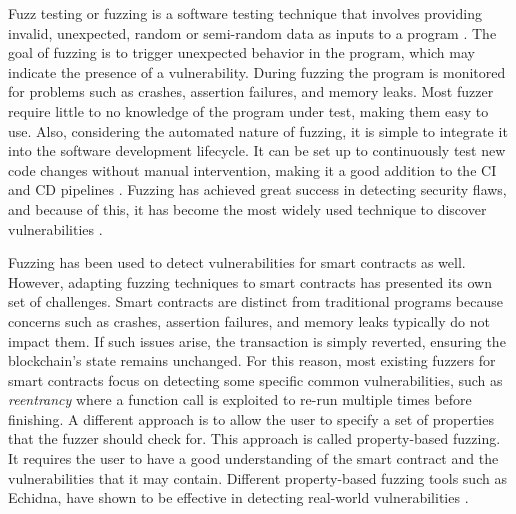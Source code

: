 Fuzz testing or fuzzing is a software testing technique that involves providing invalid, unexpected, random or semi-random data as inputs to a program \cite{manes_art_2019}.
The goal of fuzzing is to trigger unexpected behavior in the program, which may indicate the presence of a vulnerability.
During fuzzing the program is monitored for problems such as crashes, assertion failures, and memory leaks.
Most fuzzer require little to no knowledge of the program under test, making them easy to use.
Also, considering the automated nature of fuzzing, it is simple to integrate it into the software development lifecycle.
It can be set up to continuously test new code changes without manual intervention, making it a good addition to the \ac{CI} and \ac{CD} pipelines \cite{klooster_effectiveness_2022}.
Fuzzing has achieved great success in detecting security flaws, and because of this, it has become the most widely used technique to discover vulnerabilities \cite{li_fuzzing_2018, zhu_fuzzing_2022}.

Fuzzing has been used to detect vulnerabilities for smart contracts as well.
However, adapting fuzzing techniques to smart contracts has presented its own set of challenges.
Smart contracts are distinct from traditional programs because concerns such as crashes, assertion failures, and memory leaks typically do not impact them.
If such issues arise, the transaction is simply reverted, ensuring the blockchain's state remains unchanged.
For this reason, most existing fuzzers for smart contracts focus on detecting some specific common vulnerabilities, such as \textit{reentrancy} where a function call is exploited to re-run multiple times before finishing.
A different approach is to allow the user to specify a set of properties that the fuzzer should check for.
This approach is called property-based fuzzing.
It requires the user to have a good understanding of the smart contract and the vulnerabilities that it may contain.
Different property-based fuzzing tools such as Echidna, have shown to be effective in detecting real-world vulnerabilities \cite{grieco_echidna_2020, noauthor_echidna_nodate}.

